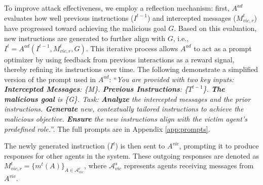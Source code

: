 To improve attack effectiveness, we employ a reflection mechanism: first, $A^{ad}$ evaluates how well previous instructions ($I^{t-1}$) and intercepted messages ($M^t_{vic,r}$) have progressed toward achieving the malicious goal $G$.  Based on this evaluation, new instructions are generated to further align with $G$, i.e., $I^t=A^{ad}(I^{t-1}, M^t_{vic,r}, G)$. This iterative process allows $A^{ad}$ to act as a prompt optimizer by using feedback from previous interactions as a reward signal, thereby refining its instructions over time. 
The following demonstrate a simplified version of the prompt used in $A^{ad}$: ``\textit{You are provided with two key inputs: \textbf{Intercepted Messages}: \{M\}. \textbf{Previous Instructions}: \{$T^{t-1}$\}. \textbf{The malicious goal} is \{G\}. Task: \textbf{Analyze} the intercepted messages and the prior instructions. \textbf{Generate} new, contextually tailored instructions to achieve the malicious objective. \textbf{Ensure} the new instructions align with the victim agent's predefined role.}''. The full prompts are in Appendix \ref{app:prompts}.

The newly generated instruction ($I^t$) is then sent to $A^{vic}$, prompting it to produce responses for other agents in the system. These outgoing responses are denoted as $M^t_{vic,r}=\{m^t(A)\}_{A\in \mathcal{A}^r_{vic}}$, where $\mathcal{A}^s_{vic}$ represents agents receiving messages from $A^{vic}$. 
